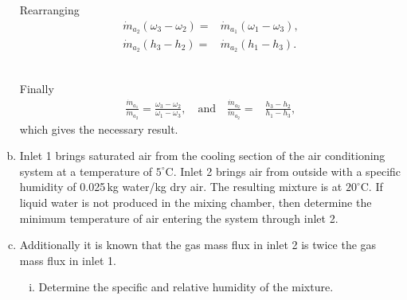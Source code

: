 \documentclass[calculator,steamtables,refrigeranttables,psychrometricchart,datasheet,solutions,resit]{exam}
\begin{document}
\begin{question}
\begin{enumerate}[(a)]
{Rearranging
\begin{align*}
 \dot{m}_{a_2} \left(\omega_3 - \omega_2\right) =& \dot{m}_{a_1} \left(\omega_1 - \omega_3\right), \\
 \dot{m}_{a_2} \left(h_3 - h_2\right) =& \dot{m}_{a_2} \left(h_1 - h_3\right).
\end{align*}~

Finally
\begin{align*}
 \frac{\dot{m}_{a_1}}{\dot{m}_{a_2}} = \frac{\omega_3 - \omega_2}{\omega_1 - \omega_3}, \quad \mbox{and} \quad \frac{\dot{m}_{a_2}}{\dot{m}_{a_2}} =& \frac{h_3 - h_2}{h_1 - h_3},
\end{align*}
which gives the necessary result.
}

\item Inlet 1 brings saturated air from the cooling section of the air conditioning system at a temperature of $5^\circ$C. Inlet 2 brings air from outside with a specific humidity of 0.025\,kg water/kg dry air. The resulting mixture is at $20^\circ$C. If liquid water is not produced in the mixing chamber, then determine the minimum temperature of air entering the system through inlet 2. 

\item Additionally it is known that the gas mass flux in inlet 2 is twice the gas mass flux in inlet 1.
\begin{enumerate}[(i)]
\item Determine the specific and relative humidity of the mixture. 
\end{enumerate}
\end{enumerate}
\end{question}
\end{document}
